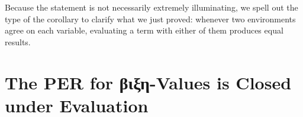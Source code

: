 
Because the  statement is not necessarily extremely illuminating, we spell
out the type of the corollary to clarify what we just proved: whenever two environments
agree on each variable, evaluating a term with either of them produces equal results.


\section{The PER for βιξη-Values is Closed under Evaluation}
